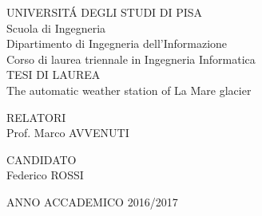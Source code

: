 \begin{titlepage}
    \begin{center}
      UNIVERSIT\'{A} DEGLI STUDI DI PISA\\
      Scuola di Ingegneria\\
      Dipartimento di Ingegneria dell'Informazione\\
      Corso di laurea triennale in Ingegneria Informatica\\
      \vspace*{5\baselineskip}
      TESI DI LAUREA\\
      The automatic weather station of La Mare glacier
      \vspace*{10\baselineskip}      
    \end{center}
    
    \begin{flushleft}
      RELATORI\\
      Prof. Marco AVVENUTI\\
    \end{flushleft}
    
    \begin{flushright}
      CANDIDATO\\
      Federico ROSSI
    \end{flushright}
    \vspace{\fill}
    \begin{center}
        ANNO ACCADEMICO 2016/2017
    \end{center}
\end{titlepage}